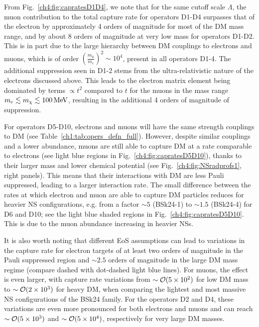 From Fig.~\ref{ch4:fig:capratesD1D4}, we note that for the same cutoff scale $\Lambda$, the muon contribution to the total capture rate for operators D1-D4 surpasses that of the electron by approximately 4 orders of magnitude for most of the DM mass range, and by about 8 orders of magnitude at very low mass for operators D1-D2. This is in part due to the large hierarchy between DM couplings to electrons and muons, which is of order $(\frac{m_\mu}{m_e})^2\sim 10^4$, present in all operators D1-4. The additional suppression seen in D1-2 stems from the ultra-relativistic nature of the electrons discussed above. This leads to the electron matrix element being dominated by terms $\propto t^2$ compared to $t$ for the muons in the mass range $m_e \lesssim m_\chi\lesssim 100{\rm \,MeV}$, resulting in the additional 4 orders of magnitude of suppression.

For operators D5-D10, electrons and muons will have the same strength couplings to DM (see Table~\ref{ch1:tab:opers_defn_full}). However, despite similar couplings and a lower abundance, muons are still able to capture DM at a rate comparable to electrons (see light blue regions in Fig.~\ref{ch4:fig:capratesD5D10}), thanks to their larger mass and lower chemical potential (see Fig.~\ref{ch4:fig:NSradprofs1}, right panels). This means that their interactions with DM are less Pauli suppressed, leading to a larger interaction rate. The small difference between the rates at which electron and muon are able to capture DM particles reduces for heavier NS configurations, e.g. from a factor $\sim5$ (BSk24-1) to $\sim 1.5$ (BSk24-4) for D6 and D10; see the light blue shaded regions in Fig.~\ref{ch4:fig:capratesD5D10}. This is due to the muon abundance increasing in heavier NSs.



It is also worth noting that different EoS assumptions can lead to variations in the capture rate for electron targets of at least two orders of magnitude in the Pauli suppressed region and $\sim 2.5$ orders of magnitude in the large DM mass regime (compare dashed with dot-dashed light blue lines). For muons, the effect is even larger, with capture rate variations from $\sim {\cal O}(5\times 10^2)$ for low DM mass to $\sim {\cal O}(2\times 10^3)$ for heavy DM, when comparing the lightest and most massive NS configurations of the BSk24 family. For the operators D2 and D4, these variations are even more pronounced for both electrons and muons and can reach  $\sim {\cal O}(5\times 10^3)$ and  $\sim {\cal O}(5\times 10^4)$, respectively for very large DM masses. 


